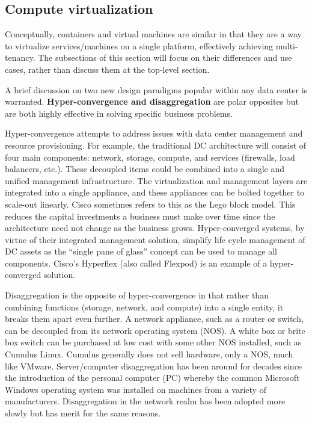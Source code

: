 \subsection{Compute virtualization}
Conceptually, containers and virtual machines are similar in that they are a
way to virtualize services/machines on a single platform, effectively
achieving multi-tenancy. The subsections of this section will focus on their
differences and use cases, rather than discuss them at the top-level
section.

A brief discussion on two new design paradigms popular within any data center
is warranted. \textbf{Hyper-convergence and disaggregation} are polar
opposites but are both highly effective in solving specific business problems.

Hyper-convergence attempts to address issues with data center management and
resource provisioning. For example, the traditional DC
architecture will consist of four main components: network, storage, compute,
and services (firewalls, load balancers, etc.). These decoupled items could be
combined into a single and unified management infrastructure. The
virtualization and management layers are integrated into a single appliance,
and these appliances can be bolted together to scale-out linearly. Cisco
sometimes refers to this as the Lego block model. This reduces the capital
investments a business must make over time since the architecture need not
change as the business grows. Hyper-converged systems, by virtue of their
integrated management solution, simplify life cycle management of DC assets as
the ``single pane of glass'' concept can be used to manage all components.
Cisco's Hyperflex (also called Flexpod) is an example of a hyper-converged
solution.

Disaggregation is the opposite of hyper-convergence in that rather than
combining functions (storage, network, and compute) into a single entity, it
breaks them apart even further. A network appliance, such as a router or
switch, can be decoupled from its network operating system (NOS). A white box
or brite box switch can be purchased at low cost with some other NOS
installed, such as Cumulus Linux. Cumulus generally does not sell hardware,
only a NOS, much like VMware. Server/computer disaggregation has been around
for decades since the introduction of the personal computer (PC) whereby the
common Microsoft Windows operating system was installed on machines from a
variety of manufacturers. Disaggregation in the network realm has been adopted
more slowly but has merit for the same reasons.
